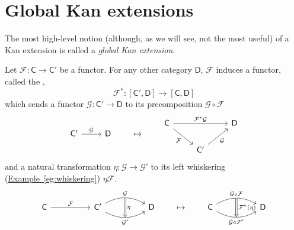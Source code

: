 \documentclass[notes.tex]{subfiles}
\begin{document}
\section{Global Kan extensions}
\label{sec:global_kan_extensions}

The most high-level notion (although, as we will see, not the most useful) of a Kan extension is called a \emph{global Kan extension.}

\begin{definition}[pullback]
  \label{def:pullback}
  Let $\mathcal{F}\colon \mathsf{C} \to \mathsf{C}'$ be a functor. For any other category $\mathsf{D}$, $\mathcal{F}$ induces a functor, called the ,
  \begin{equation*}
    \mathcal{F}^{*}\colon [\mathsf{C}', \mathsf{D}] \to [\mathsf{C}, \mathsf{D}]
  \end{equation*}
  which sends a functor $\mathcal{G}\colon \mathsf{C}' \to \mathsf{D}$ to its precomposition $\mathcal{G} \circ \mathcal{F}$
  \begin{equation*}
    \begin{tikzcd}
      \mathsf{C}'
      \arrow[r, "\mathcal{G}"]
      & \mathsf{D}
    \end{tikzcd}
    \qquad
    \mapsto
    \qquad
    \begin{tikzcd}
      \mathsf{C}
      \arrow[dr, swap, "\mathcal{F}"]
      \arrow[rr, "\mathcal{F}^{*}\mathcal{G}"]
      && \mathsf{D}
      \\
      & \mathsf{C'}
      \arrow[ur, swap, "\mathcal{G}"]
    \end{tikzcd}
  \end{equation*}
  and a natural transformation $\eta\colon \mathcal{G} \to \mathcal{G}'$ to its left whiskering (\hyperref[eg:whiskering]{Example~\ref*{eg:whiskering}}) $\eta\mathcal{F}$.
  \begin{equation*}
    \begin{tikzcd}[column sep=huge]
      \mathsf{C}
      \arrow[r, "\mathcal{F}"]
      &\mathsf{C}'
      \arrow[r, bend left, "\mathcal{G}"{name=U}]
      \arrow[r, bend right, swap, "\mathcal{G}'"{name=D}]
      & \mathsf{D}
      \arrow[from=U, to=D, Rightarrow, "\eta"]
    \end{tikzcd}
    \qquad
    \mapsto
    \qquad
    \begin{tikzcd}[column sep=huge]
      \mathsf{C}
      \arrow[r, bend left, "\mathcal{G} \circ \mathcal{F}"{name=U}]
      \arrow[r, bend right, swap, "\mathcal{G} \circ \mathcal{F}'"{name=D}]
      & \mathsf{D}
      \arrow[from=U, to=D, Rightarrow, "\mathcal{F}^{*}(\eta)"]
    \end{tikzcd}
  \end{equation*}
\end{definition}
\end{document}
